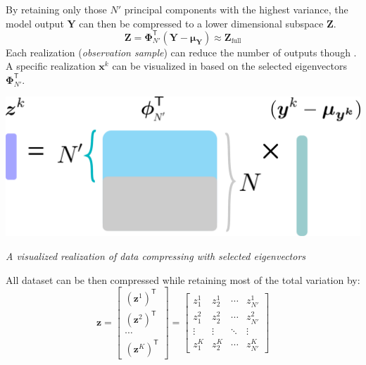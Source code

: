 \documentclass{tufte-handout}
\begin{document}
 By retaining only those $N'$ principal components with the highest variance, the model output $\boldsymbol{Y}$ can then be compressed to a lower dimensional subspace $\boldsymbol{Z}$. 
 \begin{equation}
 \label{eq: PCA-component}
\boldsymbol{Z} =  \boldsymbol{\Phi}^{\mathsf{T}}_{N'}
(\boldsymbol{Y} - \boldsymbol{\mu_{Y}}) \approx \boldsymbol{Z}_{\text{full}}
\end{equation} 
Each realization (\textit{observation sample}) can reduce the number of outputs though  . A specific realization $\boldsymbol{x}^{k}$ can be visualized in  based on the selected eigenvectors $ \boldsymbol{\Phi}^{\mathsf{T}}_{N'}$. 
\begin{marginfigure}%
  \includegraphics[width=\linewidth]{figures/figure-PCA-skematic.pdf}
  \caption{\textit{A visualized realization of data compressing with selected eigenvectors}}
  \label{fig: PCA-schematic}
\end{marginfigure} All dataset can be then compressed while retaining most of the total variation by:
\begin{equation}
    \label{PCA-components_expression_Z}
    \boldsymbol{z} = 
\begin{bmatrix}
({\boldsymbol{z}^{1}})^{\mathsf{T}} \\
({\boldsymbol{z}^{2}})^{\mathsf{T}} \\
\cdots \\
({\boldsymbol{z}^{K}})^{\mathsf{T}} 
\end{bmatrix}
=
\begin{bmatrix}
z_{1}^{1} & z_{2}^{1} & \cdots & z_{N'}^{1} \\
z_{1}^{2} & z_{2}^{2} & \cdots & z_{N'}^{2}  \\
\vdots & \vdots & \ddots & \vdots \\
z_{1}^{K} & z_{2}^{K} & \cdots & z_{N'}^{K}
\end{bmatrix} 
\end{equation}
\end{document}
